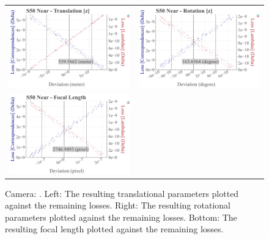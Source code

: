 \begin{figure}[!ht]
\begin{tabular}{cc}
    \includegraphics[width=0.45 \linewidth]{diagrams/calibration/s50_s_near/parameters.csv/Translation[z]_vs_Loss[Correspondences]_vs_Loss[Lambdas]_cluster_All.png} &
    \includegraphics[width=0.45 \linewidth]{diagrams/calibration/s50_s_near/parameters.csv/Rotation[z]_vs_Loss[Correspondences]_vs_Loss[Lambdas]_cluster_All.png} \\

    \includegraphics[width=0.45 \linewidth]{diagrams/calibration/s50_s_near/parameters.csv/FocalLength_vs_Loss[Correspondences]_vs_Loss[Lambdas]_cluster_All.png} &
\end{tabular}
\caption{
  Camera: .
  Left: The resulting translational parameters plotted against the remaining losses. 
  Right: The resulting rotational parameters plotted against the remaining losses.
  Bottom: The resulting focal length  plotted against the remaining losses.
     }
\label{fig:static_calibration_algorithmic_error_s50_s_near}
\end{figure}
